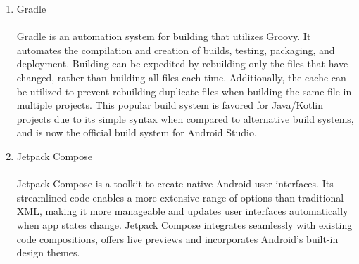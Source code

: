 \begin{enumerate}[label=\arabic*]
\begin{enumerate}[label=\alph*.]
              \item Gradle\\
                    \\
                    Gradle is an automation system for building that utilizes Groovy. It automates the compilation and creation of builds, testing, packaging, and deployment. Building can be expedited by rebuilding only the files that have changed, rather than building all files each time. Additionally, the cache can be utilized to prevent rebuilding duplicate files when building the same file in multiple projects. This popular build system is favored for Java/Kotlin projects due to its simple syntax when compared to alternative build systems, and is now the official build system for Android Studio.\\

              \item Jetpack Compose\\
                    \\
                    Jetpack Compose is a toolkit to create native Android user interfaces. Its streamlined code enables a more extensive range of options than traditional XML, making it more manageable and updates user interfaces automatically when app states change. Jetpack Compose integrates seamlessly with existing code compositions, offers live previews and incorporates Android's built-in design themes.\\


\end{enumerate}
\end{enumerate}
